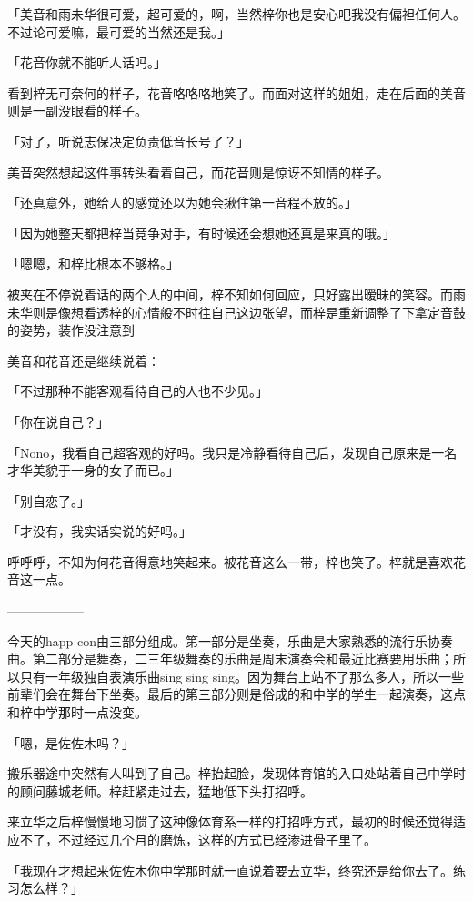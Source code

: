 \documentclass[UTF8]{ctexart}
\begin{document}
    「美音和雨未华很可爱，超可爱的，啊，当然梓你也是安心吧我没有偏袒任何人。不过论可爱嘛，最可爱的当然还是我。」

    「花音你就不能听人话吗。」

    看到梓无可奈何的样子，花音咯咯咯地笑了。而面对这样的姐姐，走在后面的美音则是一副没眼看的样子。

    「对了，听说志保决定负责低音长号了？」

    美音突然想起这件事转头看着自己，而花音则是惊讶不知情的样子。

    「还真意外，她给人的感觉还以为她会揪住第一音程不放的。」

    「因为她整天都把梓当竞争对手，有时候还会想她还真是来真的哦。」

    「嗯嗯，和梓比根本不够格。」

    被夹在不停说着话的两个人的中间，梓不知如何回应，只好露出暧昧的笑容。而雨未华则是像想看透梓的心情般不时往自己这边张望，而梓是重新调整了下拿定音鼓的姿势，装作没注意到

    美音和花音还是继续说着：

    「不过那种不能客观看待自己的人也不少见。」

    「你在说自己？」

    「Nono，我看自己超客观的好吗。我只是冷静看待自己后，发现自己原来是一名才华美貌于一身的女子而已。」

    「别自恋了。」

    「才没有，我实话实说的好吗。」

    呼呼呼，不知为何花音得意地笑起来。被花音这么一带，梓也笑了。梓就是喜欢花音这一点。

    ——————

    今天的happ con由三部分组成。第一部分是坐奏，乐曲是大家熟悉的流行乐协奏曲。第二部分是舞奏，二三年级舞奏的乐曲是周末演奏会和最近比赛要用乐曲；所以只有一年级独自表演乐曲sing sing sing。因为舞台上站不了那么多人，所以一些前辈们会在舞台下坐奏。最后的第三部分则是俗成的和中学的学生一起演奏，这点和梓中学那时一点没变。

    「嗯，是佐佐木吗？」

    搬乐器途中突然有人叫到了自己。梓抬起脸，发现体育馆的入口处站着自己中学时的顾问藤城老师。梓赶紧走过去，猛地低下头打招呼。

    来立华之后梓慢慢地习惯了这种像体育系一样的打招呼方式，最初的时候还觉得适应不了，不过经过几个月的磨炼，这样的方式已经渗进骨子里了。

    「我现在才想起来佐佐木你中学那时就一直说着要去立华，终究还是给你去了。练习怎么样？」
\end{document}
